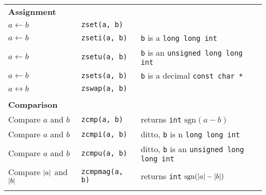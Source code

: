 \documentclass[10pt,draft]{article}
\DeclarePairedDelimiter\ab{\lvert}{\rvert}
\begin{document}
\begin{tabular}{lll}
\textbf{Assignment}           & {}                         & {}                                                \\
$a \gets b$                   & {\tt zset(a, b)}           &                                                   \\
$a \gets b$                   & {\tt zseti(a, b)}          & {\tt b} is a {\tt long long int}                  \\
$a \gets b$                   & {\tt zsetu(a, b)}          & {\tt b} is an {\tt unsigned long long int}        \\
$a \gets b$                   & {\tt zsets(a, b)}          & {\tt b} is a decimal {\tt const char *}           \\
$a \leftrightarrow b$         & {\tt zswap(a, b)}          &                                                   \\
\\

\textbf{Comparison}           & {}                         & {}                                                \\
Compare $a$ and $b$           & {\tt zcmp(a, b)}           & returns {\tt int} $\mbox{sgn}(a - b)$             \\
Compare $a$ and $b$           & {\tt zcmpi(a, b)}          & ditto, {\tt b} is n {\tt long long int}           \\
Compare $a$ and $b$           & {\tt zcmpu(a, b)}          & ditto, {\tt b} is an {\tt unsigned long long int} \\
Compare $\ab{a}$ and $\ab{b}$ & {\tt zcmpmag(a, b)}        & returns {\tt int} $\mbox{sgn}(\ab{a} - \ab{b})$   \\
\\

\end{tabular}
\newpage
\end{document}
